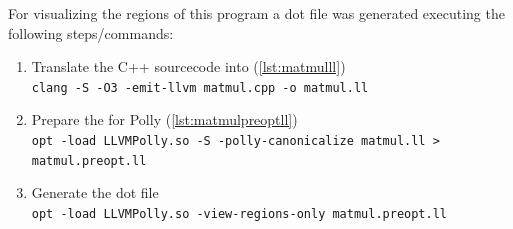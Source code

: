 For visualizing the regions of this program a dot file was generated executing the following steps/commands:
\begin{enumerate}
    \item Translate the C++ sourcecode into \llvmir (\autoref{lst:matmulll})\\
        \texttt{clang -S -O3 -emit-llvm matmul.cpp -o matmul.ll}
    \item Prepare the \llvmir for Polly (\autoref{lst:matmulpreoptll})\\
        \texttt{opt -load LLVMPolly.so -S -polly-canonicalize matmul.ll > matmul.preopt.ll}
    \item Generate the dot file\\
        \texttt{opt -load LLVMPolly.so -view-regions-only matmul.preopt.ll}
\end{enumerate}
